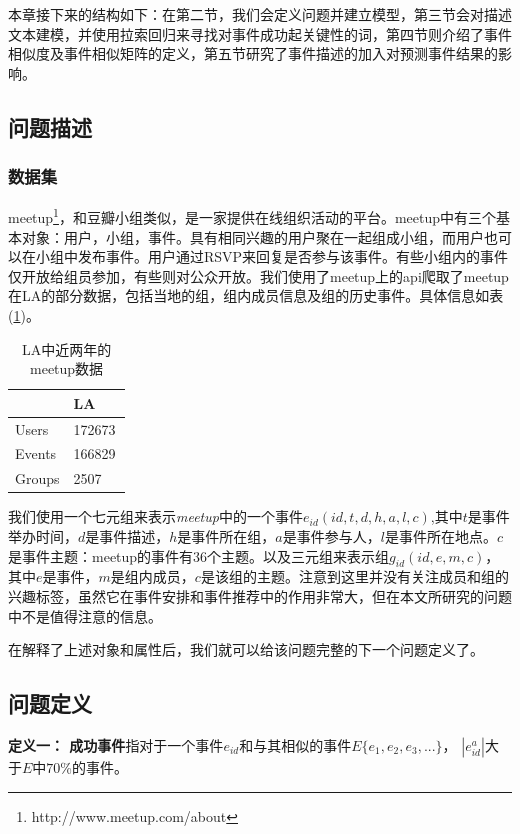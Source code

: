 本章接下来的结构如下：在第二节，我们会定义问题并建立模型，第三节会对描述文本建模，并使用拉索回归来寻找对事件成功起关键性的词，第四节则介绍了事件相似度及事件相似矩阵的定义，第五节研究了事件描述的加入对预测事件结果的影响。

\subsection{问题描述}
\subsubsection{数据集}
meetup\footnote{http://www.meetup.com/about}，和豆瓣小组类似，是一家提供在线组织活动的平台。meetup中有三个基本对象：用户，小组，事件。具有相同兴趣的用户聚在一起组成小组，而用户也可以在小组中发布事件。用户通过RSVP来回复是否参与该事件。有些小组内的事件仅开放给组员参加，有些则对公众开放。我们使用了meetup上的api爬取了meetup在LA的部分数据，包括当地的组，组内成员信息及组的历史事件。具体信息如表(\ref{t1-1})。

\begin{table}[htb] 
  \centering  
  \caption{\label{t1-1}LA中近两年的meetup数据}
    \begin{tabular*}{\linewidth}{p{0.5\linewidth}p{0.5\linewidth}}
\toprule
    & LA \\
\midrule
    Users & 172673\\
    Events & 166829\\
    Groups & 2507\\
\bottomrule
    \end{tabular*}
\end{table}

我们使用一个七元组来表示\textit{meetup}中的一个事件\(e_{id}(id,t,d,h,a,l,c)\),其中\(t\)是事件举办时间，\(d\)是事件描述，\(h\)是事件所在组，\(a\)是事件参与人，\(l\)是事件所在地点。\(c\)是事件主题：meetup的事件有36个主题。以及三元组来表示组\(g_{id}(id,e,m,c)\)，其中\(e\)是事件，\(m\)是组内成员，\(c\)是该组的主题。注意到这里并没有关注成员和组的兴趣标签，虽然它在事件安排和事件推荐中的作用非常大，但在本文所研究的问题中不是值得注意的信息。

在解释了上述对象和属性后，我们就可以给该问题完整的下一个问题定义了。

\subsection{问题定义}
\textbf{定义一： 成功事件}指对于一个事件\(e_{id}\)和与其相似的事件\(E\{e_1,e_2,e_3,...\}\)，
\(|e_{id}^a|\)大于\(E\)中\(70\)\%的事件。

